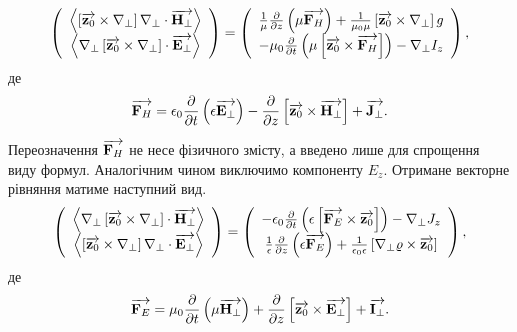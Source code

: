 %
\begin{equation} \label{eq:wboHinit}
\left( \begin{array}{c} 
\left< \left[ \overrightarrow{\mathbf z_0} \times \nabla_\perp \right] \nabla_\perp \cdot \overrightarrow{\mathbf H_\perp} \right> \\
\left< \nabla_\perp \left[ \overrightarrow{\mathbf z_0} \times \nabla_\perp \right] \cdot \overrightarrow{\mathbf E_\perp} \right> \\
\end{array} \right) = \left( \begin{array}{c} 
\frac{1}{\mu} \frac{\partial }{\partial z} \left( \mu \overrightarrow{\mathbf F_H} \right) +
\frac{1}{\mu_0 \mu} \left[ \overrightarrow{\mathbf z_0} \times \nabla_\perp \right] g \\
- \mu_0 \frac{\partial }{\partial t} \left( \mu \left[ \overrightarrow{\mathbf z_0} \times \overrightarrow{\mathbf F_H} \right] \right) -
\nabla_\perp I_z 
\end{array} \right),
\end{equation}
%
де
%
\begin{equation} \label{eq:F_H}
\overrightarrow{\mathbf F_H} = \epsilon_0 \frac{\partial }{\partial t} \left( \epsilon \overrightarrow{\mathbf E_\perp} \right) - 
\frac{\partial }{\partial z} \left[ \overrightarrow{\mathbf z_0} \times \overrightarrow{\mathbf H_\perp} \right] + \overrightarrow{\mathbf J_\perp}.
\end{equation}

Переозначення $ \overrightarrow{\mathbf F_H} $ не несе фізичного змісту, а введено лише для 
спрощення виду формул. Аналогічним чином виключимо компоненту $ E_z $. 
Отримане векторне рівняння матиме наступний вид.
%
\begin{equation} \label{eq:wboEinit}
\left( \begin{array}{c} 
\left< \nabla_\perp \left[ \overrightarrow{\mathbf z_0} \times \nabla_\perp \right] \cdot \overrightarrow{\mathbf H_\perp} \right> \\
\left< \left[ \overrightarrow{\mathbf z_0} \times \nabla_\perp \right] \nabla_\perp \cdot \overrightarrow{\mathbf E_\perp} \right> \\
\end{array} \right) = \left( \begin{array}{c} 
- \epsilon_0 \frac{\partial }{\partial t} \left( \epsilon \left[ \overrightarrow{\mathbf F_E} \times \overrightarrow{\mathbf z_0} \right] 
\right) - \nabla_\perp J_z \\
\frac{1}{\epsilon} \frac{\partial }{\partial z} \left( \epsilon \overrightarrow{\mathbf F_E} \right) +
\frac{1}{\epsilon_0 \epsilon} \left[ \nabla_\perp \varrho \times \overrightarrow{\mathbf z_0} \right]
\end{array} \right),
\end{equation}
%
де
%
\begin{equation} \label{eq:F_E}
\overrightarrow{\mathbf F_E} = \mu_0 \frac{\partial }{\partial t} \left( \mu  \overrightarrow{\mathbf H_\perp} \right) +
\frac{\partial }{\partial z} \left[ \overrightarrow{\mathbf z_0} \times \overrightarrow{\mathbf E_\perp} \right] + \overrightarrow{\mathbf I_\perp}.
\end{equation}

